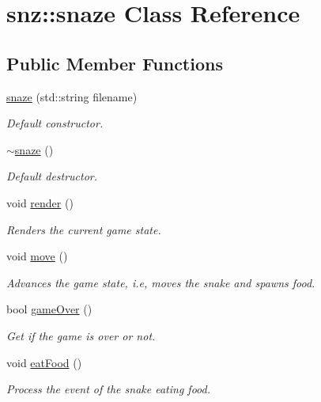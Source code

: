 \hypertarget{classsnz_1_1snaze}{}\section{snz\+:\+:snaze Class Reference}
\label{classsnz_1_1snaze}
\subsection*{Public Member Functions}
\begin{DoxyCompactItemize}
\item 
\hyperlink{classsnz_1_1snaze_ad237720b60ff28c6947fcf0b99a18c77}{snaze} (std\+::string filename)
\begin{DoxyCompactList}\small\item\em Default constructor. \end{DoxyCompactList}\item 
\mbox{\label{classsnz_1_1snaze_a30242bf3b637dbbb4ad8d452639a31c6}} 
\hyperlink{classsnz_1_1snaze_a30242bf3b637dbbb4ad8d452639a31c6}{$\sim$snaze} ()
\begin{DoxyCompactList}\small\item\em Default destructor. \end{DoxyCompactList}\item 
\mbox{\label{classsnz_1_1snaze_a8461a4dfdb2249a2f23306e33a6a8e2e}} 
void \hyperlink{classsnz_1_1snaze_a8461a4dfdb2249a2f23306e33a6a8e2e}{render} ()
\begin{DoxyCompactList}\small\item\em Renders the current game state. \end{DoxyCompactList}\item 
\mbox{\label{classsnz_1_1snaze_a684837948ec3986f2d94e749132d687e}} 
void \hyperlink{classsnz_1_1snaze_a684837948ec3986f2d94e749132d687e}{move} ()
\begin{DoxyCompactList}\small\item\em Advances the game state, i.\+e, moves the snake and spawns food. \end{DoxyCompactList}\item 
\mbox{\label{classsnz_1_1snaze_aaa0d80327f05e4a441dae8545c985727}} 
bool \hyperlink{classsnz_1_1snaze_aaa0d80327f05e4a441dae8545c985727}{game\+Over} ()
\begin{DoxyCompactList}\small\item\em Get if the game is over or not. \end{DoxyCompactList}\item 
void \hyperlink{classsnz_1_1snaze_ab1dc8fc6041a3f74824d43e11ae48e92}{eat\+Food} ()
\begin{DoxyCompactList}\small\item\em Process the event of the snake eating food. \end{DoxyCompactList}\end{DoxyCompactItemize}


